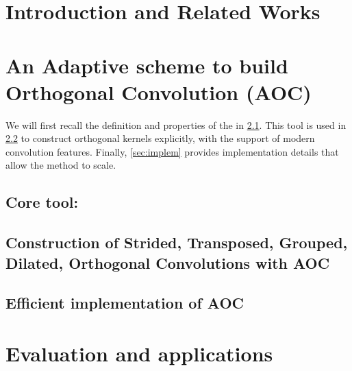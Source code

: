 \documentclass{article}
\begin{document}

\section{Introduction and Related Works}

    
    
\section{An Adaptive scheme to build Orthogonal Convolution (AOC)}\label{sec:AOC}

    We will first recall the definition and properties of the \Bconv{} in \cref{sec:fusing_kernel}. 
    This tool is used in \cref{sec:construction} to construct orthogonal kernels explicitly, with the support of modern convolution features. 
    Finally, \cref{sec:implem} provides implementation details that allow the method to scale. 
    
\subsection{Core tool: \Bconv}\label{sec:fusing_kernel}

    
    
\subsection{Construction of Strided, Transposed, Grouped, Dilated, Orthogonal Convolutions with AOC}\label{sec:construction}

    

\subsection{Efficient implementation of AOC}


    
\section{Evaluation and applications}
\end{document}
